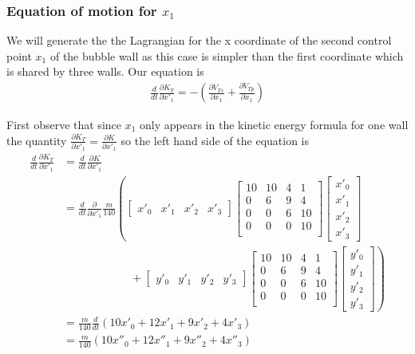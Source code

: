 \documentclass{article}
\begin{document}
\subsubsection{Equation of motion for $x_1$}
We will generate the the Lagrangian for the x coordinate of the second control
point $x_1$ of the bubble wall as this case is simpler than the first
coordinate which is shared by three walls.  Our equation is
\begin{align*}
 \frac{d}{d t} \frac{\partial K_T}{\partial x'_1} =-\left(\frac{\partial
 V_{Ts}}{\partial x_1} + \frac{\partial V_{Tp}}{\partial x_1}\right)
\end{align*}

First observe that since $x_1$ only appears in the kinetic energy formula for
one wall the quantity $\frac{\partial K_T}{\partial x'_1}=\frac{\partial K}{\partial x'_1}$
 so the left hand side of the equation is 
\begin{align*}
\frac{d}{d t} \frac{\partial K_T}{\partial x'_1} &=
\frac{d}{d t} \frac{\partial K}{\partial x'_1}\\
 &= \frac{d}{d t}
 \frac{\partial }{\partial x'_1} \frac{m}{140} \left(
\begin{bmatrix} x'_0 & x'_1 & x'_2 & x'_3 \end{bmatrix}
 \begin{bmatrix} 
10 & 10 & 4 & 1\\
0 & 6 & 9 & 4\\
0 & 0 & 6 & 10\\
0 & 0 & 0 & 10\\ 
\end{bmatrix}
\begin{bmatrix} x'_0\\x'_1\\x'_2\\x'_3 \end{bmatrix}
\right.\\
&\qquad\qquad\qquad+ \left.
\begin{bmatrix} y'_0 & y'_1 & y'_2 & y'_3 \end{bmatrix}
 \begin{bmatrix} 
10 & 10 & 4 & 1\\
0 & 6 & 9 & 4\\
0 & 0 & 6 & 10\\
0 & 0 & 0 & 10\\ 
\end{bmatrix}
\begin{bmatrix} y'_0\\y'_1\\y'_2\\y'_3 \end{bmatrix} 
\right)\\ 
&= \frac{m}{140} \frac{d}{d t}\left(10x'_0+12x'_1+9x'_2+4x'_3 \right)\\
&= \frac{m}{140} \left(10x''_0+12x''_1+9x''_2+4x''_3 \right)
\end{align*}
\end{document}
